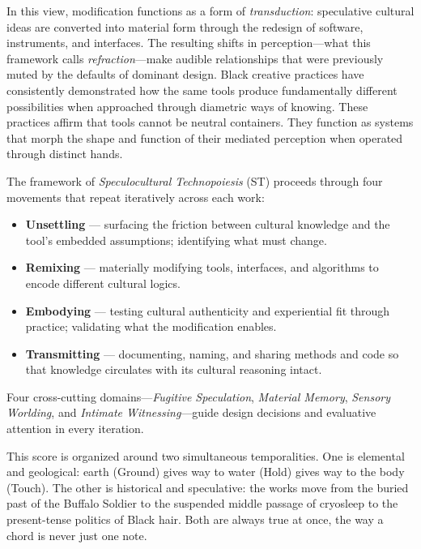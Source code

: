 In this view, modification functions as a form of \textit{transduction}: speculative cultural ideas are converted into material form through the redesign of software, instruments, and interfaces. The resulting shifts in perception---what this framework calls \textit{refraction}---make audible relationships that were previously muted by the defaults of dominant design. Black creative practices have consistently demonstrated how the same tools produce fundamentally different possibilities when approached through diametric ways of knowing. These practices affirm that tools cannot be neutral containers. They function as systems that morph the shape and function of their mediated perception when operated through distinct hands.

The framework of \textit{Speculocultural Technopoiesis} (ST) proceeds through four movements that repeat iteratively across each work:

\begin{itemize}
    \item \textbf{Unsettling} --- surfacing the friction between cultural knowledge and the tool's embedded assumptions; identifying what must change.
    \item \textbf{Remixing} --- materially modifying tools, interfaces, and algorithms to encode different cultural logics.
    \item \textbf{Embodying} --- testing cultural authenticity and experiential fit through practice; validating what the modification enables.
    \item \textbf{Transmitting} --- documenting, naming, and sharing methods and code so that knowledge circulates with its cultural reasoning intact.
\end{itemize}

Four cross-cutting domains---\textit{Fugitive Speculation}, \textit{Material Memory}, \textit{Sensory Worlding}, and \textit{Intimate Witnessing}---guide design decisions and evaluative attention in every iteration.

This score is organized around two simultaneous temporalities. One is elemental and geological: earth (Ground) gives way to water (Hold) gives way to the body (Touch). The other is historical and speculative: the works move from the buried past of the Buffalo Soldier to the suspended middle passage of cryosleep to the present-tense politics of Black hair. Both are always true at once, the way a chord is never just one note.

